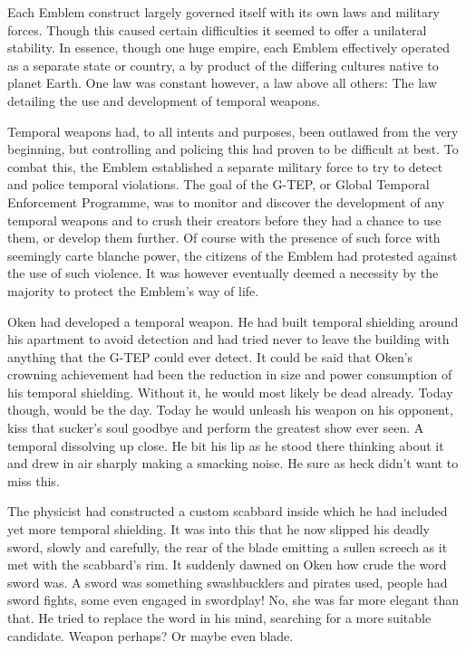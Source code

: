 Each Emblem construct largely governed itself with its own laws and military forces. Though this caused certain difficulties it seemed to offer a unilateral stability. In essence, though one huge empire, each Emblem effectively operated as a separate state or country, a by product of the differing cultures native to planet Earth. One law was constant however, a law above all others: The law detailing the use and development of temporal weapons.

Temporal weapons had, to all intents and purposes, been outlawed from the very beginning, but controlling and policing this had proven to be difficult at best. To combat this, the Emblem established a separate military force to try to detect and police temporal violations. The goal of the G-TEP, or Global Temporal Enforcement Programme, was to monitor and discover the development of any temporal weapons and to crush their creators before they had a chance to use them, or develop them further. Of course with the presence of such force with seemingly carte blanche power, the citizens of the Emblem had protested against the use of such violence. It was however eventually deemed a necessity by the majority to protect the Emblem's way of life.

Oken had developed a temporal weapon. He had built temporal shielding around his apartment to avoid detection and had tried never to leave the building with anything that the G-TEP could ever detect. It could be said that Oken's crowning achievement had been the reduction in size and power consumption of his temporal shielding. Without it, he would most likely be dead already. Today though, would be the day. Today he would unleash his weapon on his opponent, kiss that sucker's soul goodbye and perform the greatest show ever seen. A temporal dissolving up close. He bit his lip as he stood there thinking about it and drew in air sharply making a smacking noise. He sure as heck didn't want to miss this.

The physicist had constructed a custom scabbard inside which he had included yet more temporal shielding. It was into this that he now slipped his deadly sword, slowly and carefully, the rear of the blade emitting a sullen screech as it met with the scabbard's rim. It suddenly dawned on Oken how crude the word sword was. A sword was something swashbucklers and pirates used, people had sword fights, some even engaged in swordplay! No, she was far more elegant than that. He tried to replace the word in his mind, searching for a more suitable candidate. Weapon perhaps? Or maybe even blade.

